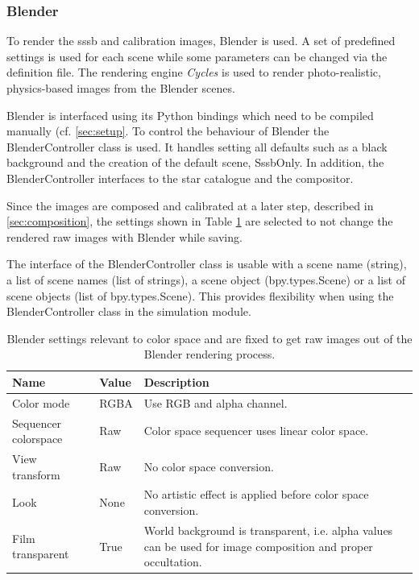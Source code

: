 \subsubsection{Blender}
To render the \gls{sssb} and calibration images, Blender is used. A set of predefined settings is used for each scene while some parameters can be changed via the definition file. The rendering engine \textit{Cycles} is used to render photo-realistic, physics-based images from the Blender scenes.

Blender is interfaced using its Python bindings which need to be compiled manually (cf. \ref{sec:setup}. To control the behaviour of Blender the BlenderController class is used. It handles setting all defaults such as a black background and the creation of the default scene, SssbOnly. In addition, the BlenderController interfaces to the star catalogue and the compositor.

Since the images are composed and calibrated at a later step, described in \ref{sec:composition}, the settings shown in Table \ref{tab:color_space} are selected to not change the rendered raw images with Blender while saving.

The interface of the BlenderController class is usable with a scene name (string), a list of scene names (list of strings), a scene object (bpy.types.Scene) or a list of scene objects (list of bpy.types.Scene). This provides flexibility when using the BlenderController class in the simulation module.

\begin{table}[htpb]
\caption{Blender settings relevant to color space and are fixed to get raw images out of the Blender rendering process.}
\label{tab:color_space}
\begin{tabular}{p{}|p{}|p{}}
\textbf{Name}        & \textbf{Value} & \textbf{Description}                                                                                         \\ \hline
Color mode           & RGBA           & Use RGB and alpha channel.                                                                                   \\
Sequencer colorspace & Raw            & Color space sequencer uses linear color space.                                                               \\
View transform       & Raw            & No color space conversion.                                                                                   \\
Look                 & None           & No artistic effect is applied before color space conversion.                                                 \\
Film transparent     & True           & World background is transparent, i.e. alpha values can be used for image composition and proper occultation.
\end{tabular}
\end{table}

